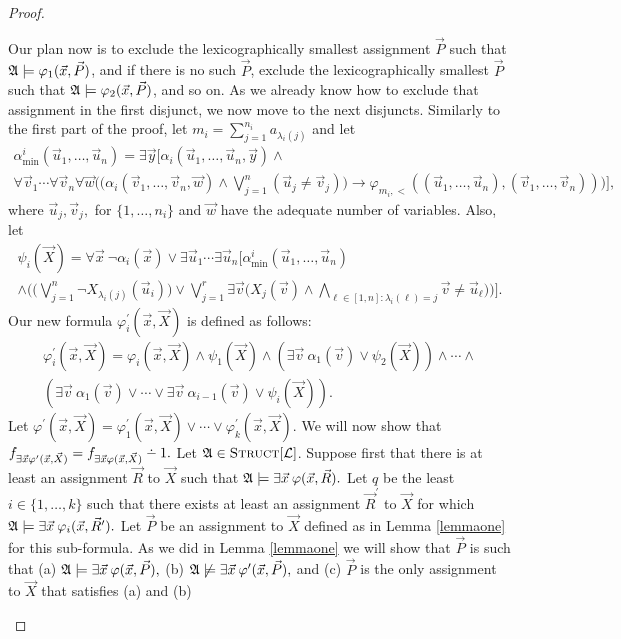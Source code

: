 \documentclass[12pt]{article}
\def\dotminus{\mathbin{\ooalign{\hss\raise1ex\hbox{.}\hss\cr
  \mathsurround=0pt$-$}}}
\def\Truc{\textsc{Struct}[\L]}
\def\A{{\frak A}}
\def\L{{\cal L}}
\def\P{\vec{P}}
\def\R{\vec{R}}
\def\X{\vec{X}}
\def\u{\vec{u}} %
\def\v{\vec{v}} %
\def\w{\vec{w}} %
\def\x{\vec{x}} %
\def\y{\vec{y}} %
\begin{document}
\begin{proof}
\begin{enumerate}
Our plan now is to exclude the lexicographically smallest assignment $\P$ such that $\A\models\varphi_1(\x,\P)$, and if there is no such $\P$, exclude the lexicographically smallest $\P$ such that $\A\models\varphi_2(\x,\P)$, and so on. As we already know how to exclude that assignment in the first disjunct, we now move to the next disjuncts. Similarly to the first part of the proof, let $m_i = \sum_{j = 1}^{n_i} a_{\lambda_i(j)}$ and let
\begin{multline*}
\alpha^i_{\min}(\u_1,\dots,\u_n) = \exists\y\Big[ \alpha_i(\u_1,\dots,\u_n,\y)\wedge \\ \forall\v_1\cdots\forall\v_n\forall\w\Big(\big(\alpha_i(\v_1,\dots,\v_n,\w)\wedge\bigvee_{j=1}^n(\u_j\neq\v_j)\big)\to \varphi_{m_i,<}((\u_1,\dots,\u_n),(\v_1,\dots,\v_n))\Big)\Big],
\end{multline*}
where $\u_j,\v_j,$ for $\{1,\ldots,n_i\}$ and $\w$ have the adequate number of variables. Also, let
\begin{multline*}
\psi_i(\X) = \forall\x\:\neg\alpha_i(\x) \vee \exists\u_1\cdots\exists\u_n\bigg[\alpha^i_{\min}(\u_1,\dots,\u_n) \\ \wedge \bigg(\bigg(\bigvee_{j = 1}^{n}\neg X_{\lambda_i(j)}(\u_i) \bigg) \vee \bigvee_{j=1}^r \exists \v\Big( X_j(\v) \wedge \bigwedge_{\ell\in[1,n]: \lambda_i(\ell) = j} \v \neq \u_\ell\Big) \bigg) \bigg].
\end{multline*}
Our new formula $\varphi_i^\prime(\x,\X)$ is defined as follows:
\begin{multline}
\varphi_i^\prime(\x,\X) = \varphi_i(\x,\X) \wedge \psi_1(\X) \wedge (\exists\v\:\alpha_1(\v)\vee\psi_2(\X)) \wedge \cdots \wedge \\ (\exists\v\:\alpha_1(\v)\vee\cdots\vee\exists\v\:\alpha_{i-1}(\v)\vee\psi_i(\X)).
\end{multline}
Let $\varphi^\prime(\x,\X) = \varphi_1^\prime(\x,\X)\vee\cdots\vee\varphi_k^\prime(\x,\X).$ We will now show that $f_{\exists\x\varphi^\prime(\x,\X)} = f_{\exists\x\varphi(\x,\X)}\dotminus 1.$ Let $\A\in\Truc$. Suppose first that there is at least an assignment $\R$ to $\X$ such that $\A\models\exists\x\:\varphi(\x,\R).$ Let $q$ be the least $i\in\{1,\ldots,k\}$ such that there exists at least an assignment $\R^\prime$ to $\X$ for which $\A\models\exists\x\:\varphi_i(\x,\R^\prime).$ Let $\P$ be an assignment to $\X$ defined as in Lemma \ref{lemmaone} for this sub-formula. As we did in Lemma \ref{lemmaone} we will show that $\P$ is such that (a) $\A\models\exists\x\:\varphi(\x,\P),$ (b) $\A\not\models\exists\x\:\varphi^\prime(\x,\P),$ and (c) $\P$ is the only assignment to $\X$ that satisfies (a) and (b)

\end{enumerate}
\end{proof}
\end{document}

